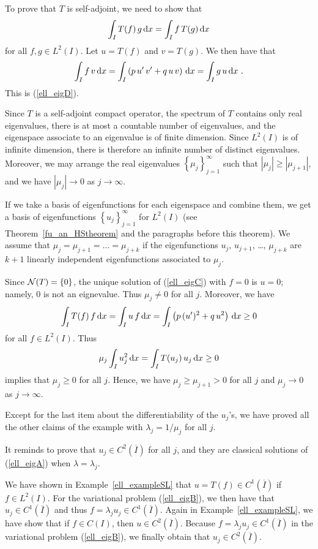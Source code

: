 \begin{egg}
To prove that $T$ is self-adjoint, we need to show that
\begin{equation} \label{ell_eigD}
\int_I T(f) \, g \,\mathrm{d}{x} = \int_I f\, T(g)\,\mathrm{d}{x}
\end{equation}
for all $\displaystyle f,g \in L^2(I)$.  Let $u=T(f)$ and $v=T(g)$.
We then have that
\[
\int_I f \, v \,\mathrm{d}{x}
= \int_I \left( p\, u'\, v' + q\, u\, v \right) \,\mathrm{d}{x}
= \int_I g \, u \,\mathrm{d}{x} \ .
\]
This is (\ref{ell_eigD}).

Since $T$ is a self-adjoint compact operator, the spectrum of $T$
contains only real eigenvalues, there is at most a countable number of
eigenvalues, and the eigenspace associate to an eigenvalue is of finite
dimension.  Since $\displaystyle L^2(I)$ is of infinite dimension, there is
therefore an infinite number of distinct eigenvalues.  Moreover, we
may arrange the real eigenvalues
$\displaystyle \left\{ \mu_j \right\}_{j=1}^\infty$
such that $|\mu_j| \geq |\mu_{j+1}|$, and we have $|\mu_j|\to 0$ as
$j \to \infty$.

If we take a basis of eigenfunctions for each eigenspace and combine
them, we get a basis of eigenfunctions
$\displaystyle \left\{u_j\right\}_{j=1}^\infty$ for $\displaystyle L^2(I)$
(see Theorem~\ref{fu_an_HStheorem} and the paragraphs before this theorem).
We assume that $\mu_{j} = \mu_{j+1} = \ldots = \mu_{j+k}$ if
the eigenfunctions $u_j$, $u_{j+1}$, \ldots, $\mu_{j+k}$ are $k+1$ linearly
independent eigenfunctions associated to $\mu_j$.

Since $\mathcal{N}(T) = \left\{ 0 \right\}$, the unique solution of 
(\ref{ell_eigC}) with $f=0$ is $u=0$; namely, $0$ is not an eignevalue.  Thus
$\mu_j \neq 0$ for all $j$.  Moreover, we have
\[
\int_I T(f)\, f \,\mathrm{d}{x} = \int_I u \,f\,\mathrm{d}{x} =
\int_I \left( p \,(u')^2 + q\, u^2 \right) \,\mathrm{d}{x} \geq 0
\]
for all $\displaystyle f \in L^2(I)$.  Thus
\[
\mu_j \int_I u_j^2 \,\mathrm{d}{x}
= \int_I T(u_j)\, u_j \,\mathrm{d}{x} \geq 0
\]
implies that $\mu_j\geq 0$ for all $j$.  Hence, we have
$\mu_j \geq \mu_{j+1} > 0$ for all $j$ and $\mu_j \to 0$ as
$j \to \infty$.

Except for the last item about the differentiability of the $u_j$'s,
we have proved all the other claims of the example with
$\lambda_j = 1/\mu_j$ for all $j$.

It reminds to prove that $\displaystyle u_j \in C^2(\overline{I})$ for
all $j$, and they are classical solutions of (\ref{ell_eigA}) when
$\lambda = \lambda_j$.

We have shown in Example~\ref{ell_exampleSL} that
$\displaystyle u = T(f) \in C^1(\overline{I})$ if
$\displaystyle f \in L^2(I)$.  For the
variational problem (\ref{ell_eigB}), we then have that
$\displaystyle u_j \in C^1(\overline{I})$ and
thus $\displaystyle f = \lambda_j u_j \in C^1(\overline{I})$.  Again in
Example~\ref{ell_exampleSL}, we have show that if $f \in C(I)$, then
$\displaystyle u \in C^2(\overline{I})$.  Because
$\displaystyle f = \lambda_j u_j \in C^1(\overline{I})$ in the variational
problem (\ref{ell_eigB}), we finally obtain that
$\displaystyle u_j \in C^2(\overline{I})$.


\end{egg}
